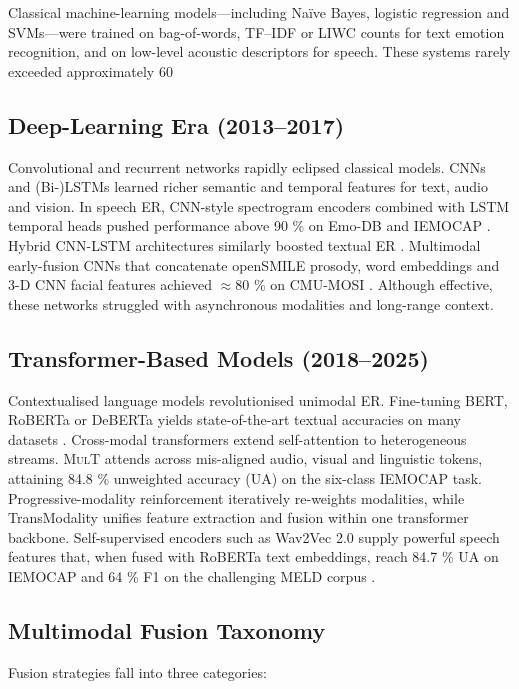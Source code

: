\documentclass[12pt]{article}
\begin{document}
Classical machine-learning models—including Naïve Bayes, logistic regression and SVMs—were trained on bag-of-words, TF–IDF or LIWC counts for text emotion recognition, and on low-level acoustic descriptors for speech. These systems rarely exceeded approximately 60%

\subsection{Deep-Learning Era (2013–2017)}
Convolutional and recurrent networks rapidly eclipsed classical models.
CNNs and \mbox{(Bi-)LSTMs} learned richer semantic and temporal features
for text, audio and vision.  In speech ER, CNN-style spectrogram
encoders combined with LSTM temporal heads pushed performance above
90 \% on Emo-DB and IEMOCAP \cite{mao2014learning}.  Hybrid CNN-LSTM
architectures similarly boosted textual ER
\cite{abdul2017emonet}.  Multimodal early-fusion CNNs that concatenate
openSMILE prosody, word embeddings and 3-D CNN facial features achieved
$\approx$80 \% on CMU-MOSI \cite{poria2018multimodal}.  Although
effective, these networks struggled with asynchronous modalities and
long-range context.

\subsection{Transformer-Based Models (2018–2025)}
Contextualised language models revolutionised unimodal ER.  Fine-tuning
BERT, RoBERTa or DeBERTa yields state-of-the-art textual accuracies on
many datasets \cite{liu2019roberta}.  Cross-modal transformers extend
self-attention to heterogeneous streams.  \textsc{MulT}
\cite{tsai2019mult} attends across mis-aligned audio, visual and
linguistic tokens, attaining 84.8 \% unweighted accuracy (UA) on the
six-class IEMOCAP task.  Progressive-modality reinforcement
\cite{lv2021progressive} iteratively re-weights modalities, while
TransModality \cite{wang2020context} unifies feature extraction and
fusion within one transformer backbone.  Self-supervised encoders such
as Wav2Vec 2.0 supply powerful speech features that, when fused with
RoBERTa text embeddings, reach 84.7 \% UA on IEMOCAP and 64 \% F1 on the
challenging MELD corpus \cite{siriwardhana2020joint}.

\subsection{Multimodal Fusion Taxonomy}
Fusion strategies fall into three categories:
\end{document}
